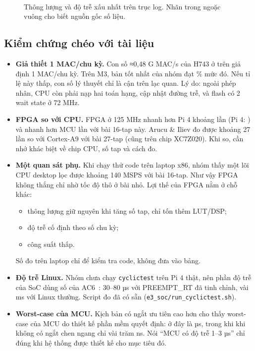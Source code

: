 \documentclass[11pt,a4paper]{article}
\begin{document}
\begin{figure}[h]
\centering
{}\\[4pt]
\caption{Thông lượng và độ trễ xấu nhất trên trục log. Nhãn trong ngoặc vuông cho biết nguồn gốc số liệu.}
\end{figure}

\subsection{Kiểm chứng chéo với tài liệu}

\begin{itemize}
\item \textbf{Giả thiết 1 MAC/chu kỳ.} Con số ≈0,48 G MAC/s của H743 ở trên giả định 1 MAC/chu kỳ. Trên M3, bản tốt nhất của nhóm đạt \expMcuEff\% mức đó. Nếu tỉ lệ này thấp, con số lý thuyết chỉ là cận trên lạc quan. Lý do: ngoài phép nhân, CPU còn phải nạp hai toán hạng, cập nhật đường trễ, và flash có 2 wait state ở 72 MHz.
\item \textbf{FPGA so với CPU.} FPGA ở 125 MHz nhanh hơn Pi 4 khoảng \expRatioFpgaPi{} lần (Pi 4: \nhan{\expPiLabel}) và nhanh hơn MCU \expRatioFpgaMcu{} lần với bài 16-tap này. Arucu \& Iliev đo được khoảng 27 lần so với Cortex-A9 với bài 27-tap (cũng trên chip XC7Z020). Khi so, cần nhớ khác biệt về chip CPU, số tap và cách đo.
\item \textbf{Một quan sát phụ.} Khi chạy thử code trên laptop x86, nhóm thấy một lõi CPU desktop lọc được khoảng 140 MSPS với bài 16-tap. Như vậy FPGA không thắng chỉ nhờ tốc độ thô ở bài nhỏ. Lợi thế của FPGA nằm ở chỗ khác:
  \begin{itemize}
  \item thông lượng giữ nguyên khi tăng số tap, chỉ tốn thêm LUT/DSP;
  \item độ trễ cố định theo số chu kỳ;
  \item công suất thấp.
  \end{itemize}
  Số đo trên laptop chỉ để kiểm tra code, không đưa vào bảng.
\item \textbf{Độ trễ Linux.} Nhóm chưa chạy \texttt{cyclictest} trên Pi 4 thật, nên phần độ trễ của SoC dùng số của AC6~\cite{ac6}: 30–80 µs với PREEMPT\_RT đã tinh chỉnh, vài ms với Linux thường. Script đo đã có sẵn (\texttt{e3\_soc/run\_cyclictest.sh}).
\item \textbf{Worst-case của MCU.} Kịch bản có ngắt ưu tiên cao hơn cho thấy worst-case của MCU do thiết kế phần mềm quyết định: ở đây là \expMcuIrqHogMax{} µs, trong khi khi không có ngắt chen ngang chỉ vài trăm ns. Nói ``MCU có độ trễ 1–3 µs'' chỉ đúng khi hệ thống được thiết kế cho mục tiêu đó.
\end{itemize}
\end{document}
